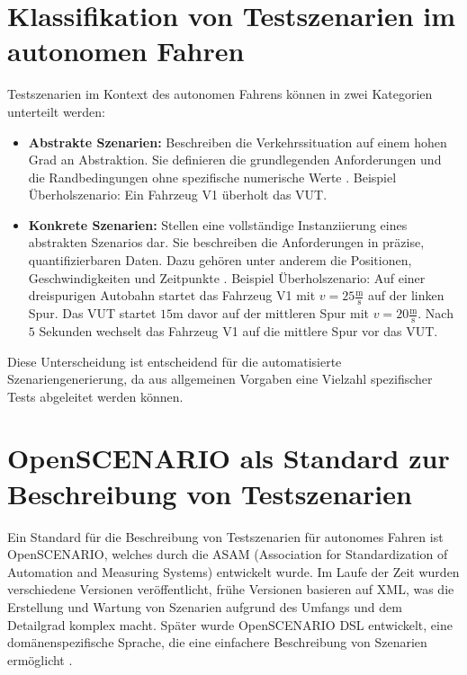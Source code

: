 \section{Klassifikation von Testszenarien im autonomen Fahren}
Testszenarien im Kontext des autonomen Fahrens können in zwei Kategorien unterteilt werden:
\begin{itemize}
    \item \textbf{Abstrakte Szenarien:}
    Beschreiben die Verkehrssituation auf einem hohen Grad an Abstraktion. Sie definieren die grundlegenden Anforderungen und die Randbedingungen ohne spezifische numerische Werte \cite{EinfuehrungIntegrationsprojekt}.
    \newline Beispiel Überholszenario: Ein Fahrzeug V1 überholt das VUT.
    \item \textbf{Konkrete Szenarien:}
    Stellen eine vollständige Instanziierung eines abstrakten Szenarios dar. Sie beschreiben die Anforderungen in präzise, quantifizierbaren Daten. Dazu gehören unter anderem die Positionen, Geschwindigkeiten und Zeitpunkte \cite{EinfuehrungIntegrationsprojekt}.
    \newline Beispiel Überholszenario: Auf einer dreispurigen Autobahn startet das Fahrzeug V1 mit $v = 25 \frac{\text{m}}{\text{s}}$ auf der linken Spur. Das VUT startet $15 \text{m}$ davor auf der mittleren Spur mit $v = 20 \frac{\text{m}}{\text{s}}$. Nach $5$ Sekunden wechselt das Fahrzeug V1 auf die mittlere Spur vor das VUT.
\end{itemize}
Diese Unterscheidung ist entscheidend für die automatisierte Szenariengenerierung, da aus allgemeinen Vorgaben eine Vielzahl spezifischer Tests abgeleitet werden können.

\section{OpenSCENARIO als Standard zur Beschreibung von Testszenarien}



Ein Standard für die Beschreibung von Testszenarien für autonomes Fahren ist OpenSCENARIO, welches durch die ASAM (Association for Standardization of Automation and Measuring Systems) entwickelt wurde.
Im Laufe der Zeit wurden verschiedene Versionen veröffentlicht, frühe Versionen basieren auf XML, was die Erstellung und Wartung von Szenarien aufgrund des Umfangs und dem Detailgrad komplex macht.
Später wurde OpenSCENARIO DSL entwickelt, eine domänenspezifische Sprache, die eine einfachere Beschreibung von Szenarien ermöglicht \cite{EinfuehrungIntegrationsprojekt}.

